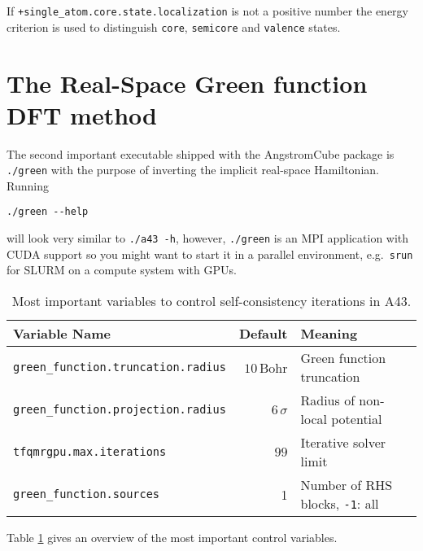 \documentclass[oribibl]{llncs}
\newcommand{\ttt}[1]{\texttt{#1}}
\newcommand{\fullcodename}{AngstromCube}
\newcommand{\codename}{A43}
\begin{document}
%
If \ttt{+single\_atom.core.state.localization} is not a positive number
the energy criterion is used to distinguish \ttt{core}, \ttt{semicore} and \ttt{valence} states.



















\cleardoublepage
\newpage

\section{The Real-Space Green function DFT method} \label{sec:green}

The second important executable shipped with the \fullcodename{} package is \ttt{./green}
with the purpose of inverting the implicit real-space Hamiltonian. Running
\begin{verbatim}
./green --help
\end{verbatim}
will look very similar to \ttt{./a43 -h}, however, \ttt{./green} is an \ac{MPI} application
with CUDA support so you might want to start it in a parallel environment, e.g.~\ttt{srun} for SLURM
on a compute system with \ac{GPU}s.

%
\begin{table}[h]
\caption[Main Variables]{
Most important variables to control self-consistency iterations in \codename{}.
} \label{tab:main-green-variables}
\centering
\begin{tabular}{|l|r|l|}
\hline
  Variable Name & Default & Meaning \\
\hline
  \ttt{green\_function.truncation.radius} & $10\,$Bohr   & Green function truncation \\
  \ttt{green\_function.projection.radius} & $6\,\sigma$  & Radius of non-local potential \\
  \ttt{tfqmrgpu.max.iterations}           & $99$         & Iterative solver limit \\
  \ttt{green\_function.sources}			  & 1            & Number of \ac{RHS} blocks, \ttt{-1}: all \\
\hline
\end{tabular}
\end{table}
%

Table \ref{tab:main-green-variables} gives an overview of the most important control variables.
\end{document}
